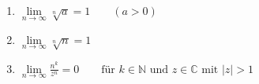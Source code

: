 \begin{enumerate}[label=(\arabic*)]
    \item $\lim\limits_{n \to \infty} \sqrt[n]{a} = 1 \qquad (a>0)$
    \item $\lim\limits_{n \to \infty} \sqrt[n]{n} = 1$
    \item $\lim\limits_{n \to \infty} \frac{n^k}{z^n} = 0 \qquad \text{für $k \in \mathbb{N}$ und $z \in \mathbb{C}$ mit $|z| > 1$}$
\end{enumerate}